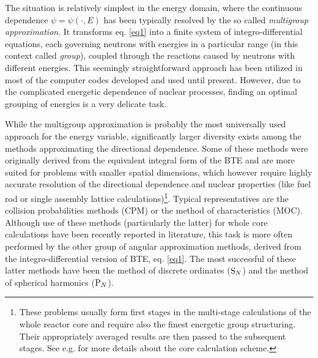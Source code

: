 The situation is relatively simplest in the energy domain, where the continuous dependence $\psi = \psi(\cdot, E)$ has been typically resolved by the so called \textit{multigroup approximation}. It transforms eq. \eqref{eq1} into a finite system of integro-differential equations, each governing neutrons with energies in a particular range (in this context called \textit{group}), coupled through the reactions caused by neutrons with different energies. This seemingly straightforward approach has been utilized in most of the computer codes developed and used until present. However, due to the complicated energetic dependence of nuclear processes, finding an optimal grouping of energies is a very delicate task.

While the multigroup approximation is probably the most universally used approach for the energy variable, significantly larger diversity exists among the methods approximating the directional dependence. Some of these methods were originally derived from the equivalent integral form of the BTE and are more suited for problems with smaller spatial dimensions, which however require highly accurate resolution of the directional dependence and nuclear properties (like fuel rod or single assembly lattice calculations)\footnote{These problems usually form first stages in the multi-stage calculations of the whole reactor core and require also the finest energetic group structuring. Their appropriately averaged results are then passed to the subsequent stages. See e.g. \cite[Chap. 17]{Reuss1} for more details about the core calculation scheme.}. Typical representatives are the collision probabilities methods (CPM) or the method of characteristics (MOC). Although use of these methods (particularly the latter) for whole core calculations have been recently reported in literature, this task is more often performed by the other group of angular approximation methods, derived from the integro-differential version of BTE, eq. \eqref{eq1}. The most successful of these latter methods have been the method of discrete ordinates ($\mathrm{S}_{N}$) and the method of spherical harmonics ($\mathrm{P}_{N}$). 

